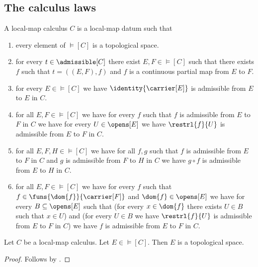 \subsection{The calculus laws}

\begin{struct}\label{local_map_calculus}
    A local-map calculus $C$ is a local-map datum such that
    \begin{enumerate}
        \item\label{calculus_models_topological}
            every element of $\models[C]$ is a topological space.
        \item\label{calculus_admissible_triples}
            for every $t\in\admissible[C]$ there exist $E,F\in\models[C]$
            such that there exists $f$ such that $t=((E,F),f)$ and
                $f$ is a continuous partial map from $E$ to $F$.
        \item\label{calculus_identity}
            for every $E\in\models[C]$ we have
                $\identity{\carrier[E]}$ is admissible from $E$ to $E$ in $C$.
        \item\label{calculus_restriction}
            for all $E,F\in\models[C]$ we have for every $f$ such that
                $f$ is admissible from $E$ to $F$ in $C$ we have
                for every $U\in\opens[E]$ we have
                    $\restrl{f}{U}$ is admissible from $E$ to $F$ in $C$.
        \item\label{calculus_composition}
            for all $E,F,H\in\models[C]$ we have for all $f,g$ such that
                $f$ is admissible from $E$ to $F$ in $C$ and
                $g$ is admissible from $F$ to $H$ in $C$ we have
                $g\circ f$ is admissible from $E$ to $H$ in $C$.
        \item\label{calculus_locality}
            for all $E,F\in\models[C]$ we have for every $f$ such that
                $f\in\funs{\dom{f}}{\carrier[F]}$ and $\dom{f}\in\opens[E]$
                we have for every $B\subseteq\opens[E]$ such that
                    (for every $x\in\dom{f}$ there exists $U\in B$ such that
                        $x\in U$) and
                    (for every $U\in B$ we have
                        $\restrl{f}{U}$ is admissible from $E$ to $F$ in $C$)
                we have $f$ is admissible from $E$ to $F$ in $C$.
    \end{enumerate}
\end{struct}

\begin{classification}\label{calculus_model_is_topological}
    Let $C$ be a local-map calculus.
    Let $E\in\models[C]$.
    Then $E$ is a topological space.
\end{classification}
\begin{proof}
    Follows by .
\end{proof}

